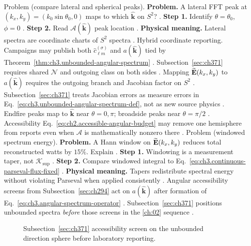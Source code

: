 Problem (compare lateral and spherical peaks). \textbf{Problem.} A lateral FFT peak at \((k_{x},k_{y})=(k_{0}\sin\theta_{0},0)\) maps to which \(\widehat{\mathbf{k}}\) on \(S^{2}\)?
\cite{jackson1999}.
\textbf{Step 1.} Identify \(\theta=\theta_{0}\), \(\phi=0\) \cite{jackson1999}.
\textbf{Step 2.} Read \(\mathcal{A}(\widehat{\mathbf{k}})\) peak location \cite{hansen1988}.
\textbf{Physical meaning.} Lateral spectra are coordinate charts of \(S^{2}\) spectra \cite{stratton1941}.
Hybrid coordinate reporting. Campaigns may publish both \(\widehat{c}_{\ell m}^{(\sigma)}\) and \(a(\widehat{\mathbf{k}})\) tied by
Theorem~\ref{thm:ch3.unbounded-angular-spectrum} \cite{hansen1988}. Subsection~\ref{sec:ch371} requires
shared \(\mathcal{N}\) and outgoing class on both sides \cite{stratton1941}.
Mapping \(\widetilde{\mathbf{E}}(k_{x},k_{y})\) to \(a(\widehat{\mathbf{k}})\) requires the outgoing branch and Jacobian factor on
\(S^{2}\) \cite{jackson1999}. Subsection~\ref{sec:ch371} treats Jacobian errors as measure errors in
Eq.~\eqref{eq:ch3.unbounded-angular-spectrum-def}, not as new source physics \cite{harrington2001}.
Endfire peaks map to \(\widehat{\mathbf{k}}\) near \(\theta=0,\pi\); broadside peaks near \(\theta=\pi/2\)
\cite{jackson1999}. Accessibility Eq.~\eqref{eq:ch2.accessible-angular-budget} may remove one hemisphere from
reports even when \(\mathcal{A}\) is mathematically nonzero there \cite{stratton1941}.
Problem (windowed spectrum energy). \textbf{Problem.} A Hann window on \(\widetilde{\mathbf{E}}(k_{x},k_{y})\) reduces total reconstructed watts by \(15\%\). Explain
\cite{harrington2001}.
\textbf{Step 1.} Windowing is a measurement taper, not \(\mathcal{K}_{\mathrm{sup}}\) \cite{harrington2001}.
\textbf{Step 2.} Compare windowed integral to Eq.~\eqref{eq:ch3.continuous-parseval-flux-fixed} \cite{poynting1884}.
\textbf{Physical meaning.} Tapers redistribute spectral energy without violating Parseval when applied consistently
\cite{stratton1941}.
Angular accessibility screens from Subsection~\ref{sec:ch294} act on \(a(\widehat{\mathbf{k}})\) after formation of
Eq.~\eqref{eq:ch3.angular-spectrum-operator} \cite{harrington2001}. Subsection~\ref{sec:ch371} positions
unbounded spectra \emph{before} those screens in the \ref{ch:02} sequence \cite{hansen1988}.
\begin{figure}[t]
\centering
{}
\caption{Subsection~\ref{sec:ch371} accessibility screen on the unbounded direction sphere before laboratory reporting.}
\label{fig:ch3.371-accessibility-screen}
\end{figure}

